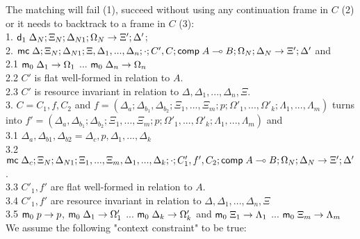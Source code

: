 \begin{itemize}
The matching will fail (1), succeed without using any continuation frame in $C$ (2) or it needs to backtrack to a frame in $C$ (3):\\
1. \hspace{1cm} $\mathsf{d}_1 \; \Delta_N; \Xi_N; \Delta_{N1}; \Omega_N \rightarrow \Xi'; \Delta'$; \\
2. \hspace{1cm} $\mathsf{mc} \; \Delta; \Xi_N; \Delta_{N1}; \Xi, \Delta_1, ..., \Delta_n; \cdot; C', C; \mathsf{comp} \; A \multimap B; \Omega_N; \Delta_N \rightarrow \Xi'; \Delta'$ and\\
2.1 \hspace{2cm} $\mathsf{m}_0 \; \Delta_1 \rightarrow \Omega_1$ ... $\mathsf{m}_0 \; \Delta_n \rightarrow \Omega_n$\\
2.2 \hspace{2cm} $C'$ is flat well-formed in relation to $A$. \\
2.3 \hspace{2cm} $C'$ is resource invariant in relation to $\Delta, \Delta_1, ..., \Delta_n, \Xi$.\\
3. \hspace{1cm} $C = C_1, f, C_2$ and $f = (\Delta_a; \Delta_{b_1}, \Delta_{b_2}; \Xi_1, ..., \Xi_m; p; \Omega'_1, ..., \Omega'_k; \Lambda_1, ..., \Lambda_m)$ turns into $f' = (\Delta_a, \Delta_{b_1}; \Delta_{b_2}; \Xi_1, ..., \Xi_m; p; \Omega'_1, ..., \Omega'_k; \Lambda_1, ..., \Lambda_m)$ and\\
3.1 \hspace{2cm} $\Delta_a, \Delta_{b1}, \Delta_{b2} = \Delta_c, p, \Delta_1, ..., \Delta_k$ \\
3.2 \hspace{2cm} $\mathsf{mc} \; \Delta_c; \Xi_N; \Delta_{N1}; \Xi_1, ..., \Xi_m, \Delta_1, ..., \Delta_k; \cdot; C'_1, f', C_2; \mathsf{comp} \; A \multimap B; \Omega_N; \Delta_N \rightarrow \Xi'; \Delta'$.\\
3.3 \hspace{2cm} $C'_1, f'$ are flat well-formed in relation to $A$. \\
3.4 \hspace{2cm} $C'_1, f'$ are resource invariant in relation to $\Delta, \Delta_1, ..., \Delta_n, \Xi$ \\
3.5 \hspace{2cm} $\mathsf{m}_0 \; p \rightarrow p$, $\mathsf{m}_0 \; \Delta_1 \rightarrow \Omega'_1$ ... $\mathsf{m}_0 \; \Delta_k \rightarrow \Omega'_k$ and $\mathsf{m}_0 \; \Xi_1 \rightarrow \Lambda_1$ ... $\mathsf{m}_0 \; \Xi_m \rightarrow \Lambda_m$\\

We assume the following "context constraint" to be true:\\


\end{itemize}
